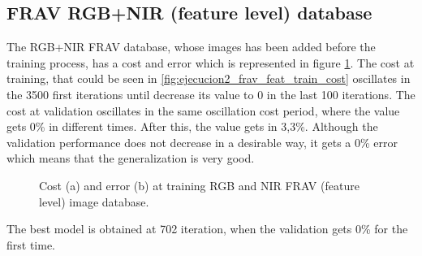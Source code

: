 \subsection{FRAV RGB+NIR (feature level) database}
The RGB+NIR FRAV database, whose images has been added before the training process, has a cost and error which is represented in figure \ref{fig:ejecucion2_frav_feat_train}. The cost at training, that could be seen in \ref{fig:ejecucion2_frav_feat_train_cost} oscillates in the 3500 first iterations until decrease its value to 0 in the last 100 iterations. The cost at validation oscillates in the same oscillation cost period, where the value gets 0\% in different times. After this, the value gets in 3,3\%. Although the validation performance does not decrease in a desirable way, it gets a 0\% error which means that the generalization is very good.\\
\begin{figure}[htb]
\centering
\caption{Cost (a) and error (b) at training RGB and NIR FRAV (feature level) image database.}
\label{fig:ejecucion2_frav_feat_train}
\end{figure}

The best model is obtained at 702 iteration, when the validation gets 0\% for the first time.\\

